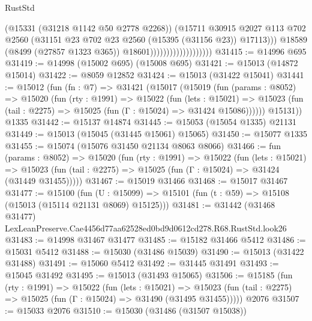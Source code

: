\begin{lexlean}{RustStd}
\begin{coremodule}
                                            (@15331 (@31218 @1142 @50 @2778 @2268))
                                            (@15711
                                              @30915
                                              @2027
                                              @113
                                              @702
                                              @2560
                                              (@31151
                                                @23
                                                @702
                                                @23
                                                @2560
                                                (@15395 (@31156 @23))
                                                @17113)))
                                          @18589
                                          (@8499 (@27857 @1323 @365))
                                          @18601)))))))))))))))))))
@31415 := @14996 @695
@31419 := @14998 (@15002 @695) (@15008 @695)
@31421 := @15013 (@14872 @15014)
@31422 := @8059 @12852
@31424 := @15013 (@31422 @15041)
@31441 := @15012
    (fun (fn : @7) =>
    @31421
      (@15017
        (@15019
          (fun (params : @8052) =>
          @15020
            (fun (rty : @1991) =>
            @15022
              (fun (lets : @15021) =>
              @15023 (fun (tail : @2275) => @15025 (fun (Γ : @15024) => @31424 @15086))))))
        @15131))
    @1335
@31442 := @15137 @14874
@31445 := @15053 (@15054 @1335) @21131
@31449 := @15013 (@15045 (@31445 @15061) @15065)
@31450 := @15077 @1335
@31455 := @15074 (@15076 @31450 @21134 @8063 @8066)
@31466 := fun (params : @8052) =>
  @15020
    (fun (rty : @1991) =>
    @15022
      (fun (lets : @15021) =>
      @15023 (fun (tail : @2275) => @15025 (fun (Γ : @15024) => @31424 (@31449 @31455)))))
@31467 := @15019 @31466
@31468 := @15017 @31467
@31477 := @15100
    (fun (U : @15099) => @15101 (fun (t : @59) => @15108 (@15013 (@15114 @21131 @8069) @15125)))
@31481 := @31442
    (@31468 @31477)
    LexLeanPreserve.Cae4456d77aa62528ed0bd9d0612cd278.R68.RustStd.look26
@31483 := @14998 @31467 @31477
@31485 := @15182 @31466 @5412
@31486 := @15031 @5412
@31488 := @15030 (@31486 @15039)
@31490 := @15013 (@31422 @31488)
@31491 := @15060 @5412
@31492 := @31445 @31491
@31493 := @15045 @31492
@31495 := @15013 (@31493 @15065)
@31506 := @15185
    (fun (rty : @1991) =>
    @15022
      (fun (lets : @15021) =>
      @15023 (fun (tail : @2275) => @15025 (fun (Γ : @15024) => @31490 (@31495 @31455)))))
    @2076
@31507 := @15033 @2076
@31510 := @15030 (@31486 (@31507 @15038))

\end{coremodule}
\end{lexlean}
